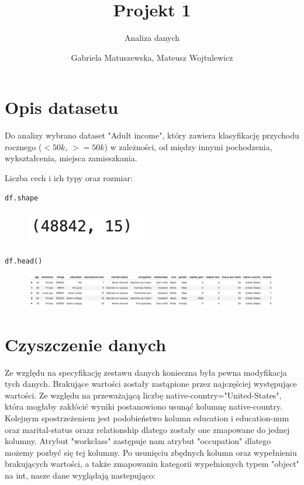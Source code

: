 \documentclass{article}
\title{Projekt 1}
\author{\LARGE{Analiza danych}}
\date{Gabriela Matuszewska, Mateusz Wojtulewicz}
\begin{document}
\maketitle

\section{Opis datasetu}
Do analizy wybrano dataset "Adult income", który zawiera klasyfikację przychodu rocznego ($<50k$, $>=50k$) w zależności, od między innymi pochodzenia, wykształcenia, miejsca zamieszkania.

Liczba cech i ich typy oraz rozmiar: 


\begin{lstlisting}
df.shape
\end{lstlisting}

\begin{figure}[h!]
\centering
\includegraphics[scale=1]{shape.png}
\end{figure}

\begin{lstlisting}
df.head()
\end{lstlisting}

\begin{figure}[h!]
\centering
\includegraphics[scale=0.3]{head.png}
\end{figure}

\section{Czyszczenie danych}
Ze względu na specyfikację zestawu danych konieczna była pewna modyfikacja tych danych. Brakujące wartości zostały zastąpione przez najczęściej występujące wartości. Ze względu na przeważającą liczbę native-country="United-States", która mogłaby zakłócić wyniki postanowiono usunąć kolumnę native-country. Kolejnym spostrzeżeniem jest podobieństwo kolumn education i education-num oraz marital-status orazz relationship dlatego zostały one zmapowane do jednej kolumny. Atrybut "workclass" zastępuje nam atrybut "occupation" dlatego możemy pozbyć się tej kolumny. Po usunięciu zbędnych kolumn oraz wypełnieniu brakujących wartości, a także zmapowaniu kategorii wypełnionych typem "object" na int, nasze dane wyglądają nastepująco: 
\end{document}
